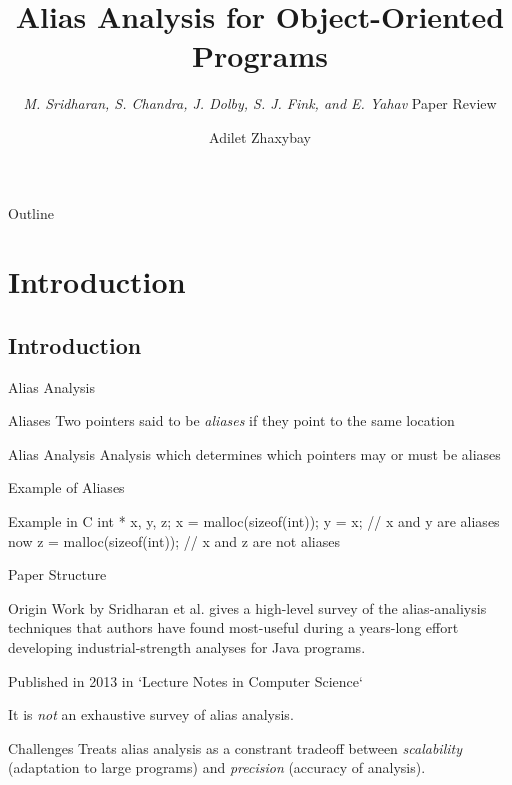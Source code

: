 \documentclass{beamer}
\title{Alias Analysis for Object-Oriented Programs}
\subtitle{\textit{M. Sridharan, S. Chandra, J. Dolby, S. J. Fink, and E. Yahav} \newline\newline \large{Paper Review}}
\institute{Nazarbayev University}
\author{Adilet Zhaxybay}
\date{}
\begin{document}
\begin{frame}
	\titlepage
\end{frame}

\begin{frame}{Outline}
  \tableofcontents
\end{frame}

\section{Introduction}

\subsection{Introduction}

\begin{frame}{Alias Analysis}
	\begin{block}{Aliases}
		Two pointers said to be \textit{aliases} if they point to the same location
	\end{block}
	\pause
	\begin{block}{Alias Analysis}
		Analysis which determines which pointers may or must be aliases
	\end{block}	
\end{frame}

\begin{frame}{Example of Aliases}
	\begin{block}{Example in C}
		int * x, y, z;
		\newline
		x = malloc(sizeof(int)); 
		\newline
		y = x; // x and y are aliases now
		\newline
		z = malloc(sizeof(int));  // x and z are not aliases
	\end{block}
\end{frame}

\begin{frame}{Paper Structure}
	\begin{block}{Origin}
		Work by Sridharan et al. gives a high-level survey of the alias-analiysis techniques that authors 
		have found most-useful during a years-long effort developing industrial-strength analyses for Java
		programs.
	\end{block}
	\pause
	\begin{block}{}
		Published in 2013 in `Lecture Notes in Computer Science`
	\end{block}
	\pause
	\begin{block}{}
		It is \textit{not} an exhaustive survey of alias analysis.
	\end{block}
	\pause
	\begin{block}{Challenges}
		Treats alias analysis as a constrant tradeoff between \textit{scalability} (adaptation to large
		 programs) and \textit{precision} (accuracy of analysis).
	\end{block}
\end{frame}
\end{document}
